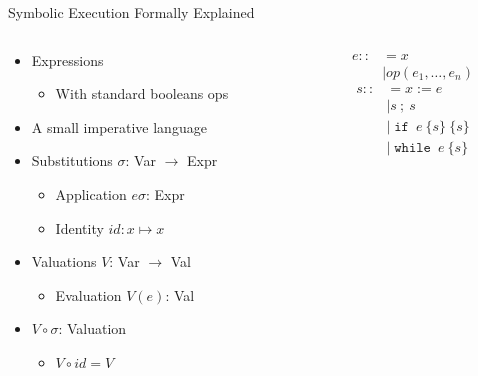 \documentclass{beamer}
\DeclareMathOperator{\ifs}{\mathtt{if}}
\DeclareMathOperator{\whiles}{\mathtt{while}}
\begin{document}
\begin{frame}{Symbolic Execution Formally Explained~\parencite{boer2021}}
  \begin{columns}[t]
    \begin{column}{.6\textwidth}
      \begin{itemize}
        \item Expressions
              \begin{itemize}
                \item With standard booleans ops
              \end{itemize}
        \item A small imperative language
        \item Substitutions $\sigma$: Var $\rightarrow$ Expr
              \begin{itemize}
                \item Application $e\sigma$: Expr
                \item Identity $id : x \mapsto x$
              \end{itemize}
        \item Valuations $V$: Var $\rightarrow$ Val
              \begin{itemize}
                \item Evaluation $V(e)$: Val
              \end{itemize}
        \item $V \circ \sigma$: Valuation
              \begin{itemize}
                \item $V \circ id = V$
              \end{itemize}
      \end{itemize}
    \end{column}%
    \begin{column}{.4\textwidth}
      \begin{align*}
        e ::&= x \\
            & \mid op(e_{1},\ldots, e_{n})
      \end{align*}
      \begin{align*}
        s ::&= x := e\\
            & \mid s~;~s\\
            & \mid \ifs~e~\{s\}~\{s\}\\
            & \mid \whiles~e~\{s\}
      \end{align*}
    \end{column}
  \end{columns}
\end{frame}
\end{document}
